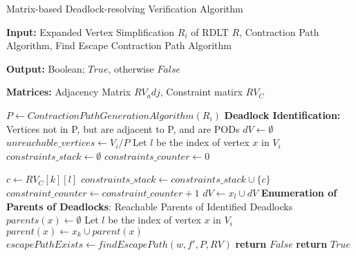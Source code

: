 \documentclass{article}
\begin{document}

\begin{algorithm}[H]
    \caption{Matrix-based Deadlock-resolving Verification Algorithm}

    \textbf{Input:} Expanded Vertex Simplification $R_i$ of RDLT $R$, Contraction Path Algorithm, Find Escape Contraction Path Algorithm  

    \textbf{Output:} Boolean; $True$, otherwise $False$

    \textbf{Matrices:} Adjacency Matrix $RV_adj$, Constraint matirx $RV_C$

    \begin{algorithmic}[1]
        \State $P \gets Contraction Path Generation Algorithm (R_i)$
        \Statex \textbf{Deadlock Identification:} Vertices not in P, but are adjacent to P, and are PODs
        \State $dV \gets \emptyset$ 
        \State $unreachable\_vertices \gets V_i / P$ 
            \State Let $l$ be the index of vertex $x$ in $V_i$
            \State $constraints\_stack \gets \emptyset$
            \State $constraints\_counter\gets 0$

                \State $c \gets RV_C[k][l]$
                    \State $constraints\_stack \gets constraints\_stack \cup \{c\}$
                    \State $constraint\_counter \gets constraint\_counter + 1$
                \EndIf
            \EndFor
                \State $dV \gets x_l \cup dV$
            \EndIf
        \EndFor
        \Statex \textbf{Enumeration of Parents of Deadlocks}: Reachable Parents of Identified Deadlocks
            \State $parents(x) \gets \emptyset$
            \State Let $l$ be the index of vertex $x$ in $V_i$
                 
                    \State $parent(x) \gets x_k \cup parent(x)$
                \EndIf
            \EndFor
                \State $escapePathExists \gets findEscapePath(w, f', P, RV_{})$
                    \State \textbf{return} $False$
                \EndIf
            \EndFor
        \EndFor
        \State \textbf{return} $True$

        
    \end{algorithmic}
\end{algorithm}




\end{document}
